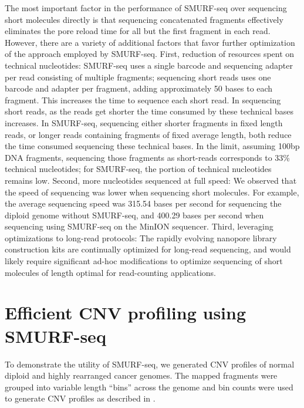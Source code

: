 The most important factor in the performance of SMURF-seq over
sequencing short molecules directly is that sequencing concatenated
fragments effectively eliminates the pore reload time for all but the
first fragment in each read. However, there are a variety of additional
factors that favor further optimization of the approach employed by
SMURF-seq.
First, reduction of resources spent on technical nucleotides: SMURF-seq
uses a single barcode and sequencing adapter per read consisting of
multiple fragments; sequencing short reads uses one barcode and adapter
per fragment, adding approximately 50 bases to each fragment. This
increases the time to sequence each short read. In sequencing short
reads, as the reads get shorter the time consumed by these technical
bases increases. In SMURF-seq, sequencing either shorter fragments in
fixed length reads, or longer reads containing fragments of fixed
average length, both reduce the time consumed sequencing these technical
bases.
%
In the limit, assuming 100bp DNA fragments, sequencing those fragments
as short-reads corresponds to 33\% technical nucleotides; for SMURF-seq,
the portion of technical nucleotides remains low.
Second, more nucleotides sequenced at full speed: We observed that the
speed of sequencing was lower when sequencing short molecules. For
example, the average sequencing speed was 315.54 bases per second for
sequencing the diploid genome without SMURF-seq, and 400.29 bases per
second when sequencing using SMURF-seq on the MinION sequencer.
Third, leveraging optimizations to long-read protocols: The rapidly
evolving nanopore library construction kits are continually optimized
for long-read sequencing, and would likely require significant ad-hoc
modifications to optimize sequencing of short molecules of length
optimal for read-counting applications.


\section{Efficient CNV profiling using SMURF-seq}
To demonstrate the utility of SMURF-seq, we generated CNV profiles of
normal diploid and highly rearranged cancer genomes.  The mapped
fragments were grouped into variable length ``bins'' across the genome
and bin counts were used to generate CNV profiles as described in
\citep{baslan2012genome,kendall2014computational}.

